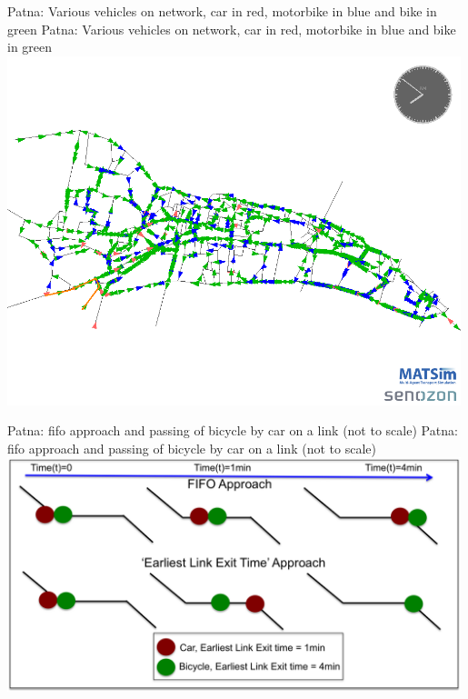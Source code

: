 \createfigure%
{Patna: Various vehicles on network, car in red, motorbike in blue and bike in green}%
{Patna: Various vehicles on network, car in red, motorbike in blue and bike in green}%
{\label{fig:patna0}}%
{\includegraphics[width=0.99\textwidth, angle=0]{using/figures/vehiclesOnNetwork}}%
{}

\createfigure%
{Patna: \protect\gls{fifo} approach and passing of bicycle by car on a link (not to scale)}%
{Patna: \protect\gls{fifo} approach and passing of bicycle by car on a link (not to scale)}%
{\label{fig:patna1}}%
{\includegraphics[width=0.99\textwidth, angle=0]{using/figures/FIFOandPassing}}%
{}

